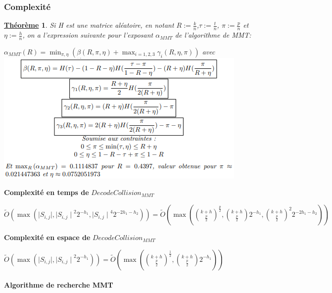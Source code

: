 \documentclass[12pt,openany]{report}
\newtheorem{theorem}{\underline{Théorème}}
\begin{document}
\subsubsection{Complexité}
\begin{theorem} \cite{Ghazal} Si H est une matrice aléatoire, en notant $ R:=\frac{k}{n} $,$  \tau:=\frac{t}{n} $, $\pi:=\frac{p}{n} $ et $ \eta :=\frac{h}{n} $, on a l'expression suivante pour l'exposant $\alpha_{MMT} $ de l'algorithme de MMT:
\begin{center}
$ \alpha_{MMT}(R)=\min_{\pi,\eta}(\beta(R,\pi,\eta)+ \max_{i=1,2,3}\gamma_i(R,\eta,\pi) )  $ avec
\includegraphics[scale=1.2]{./theo}
\end{center}

\end{theorem}


\textbf{Complexité en temps de } $DecodeCollision_{MMT}  $\\
\begin{center}


$ \tilde{O}(\max (\mid S_{i,j} \mid,{\mid S_{i,j} \mid}^{2}2^{-h_1},{\mid S_{i,j} \mid}^{4}2^{-2h_1-h_2}) )    = \tilde{O}\left( \max\left(  {{k+h}\choose {\frac{p}{2}}}^{\frac{p}{2}},{{k+h}\choose {\frac{p}{2}}}2^{-h_1} , {{k+h}\choose {\frac{p}{2}}}^{2}2^{-2h_1-h_2}\right)  \right)      $\\
\end{center}
\textbf{Complexité en espace de} $DecodeCollision_{MMT}   $\\
\begin{center}


$ \tilde{O}(\max (\mid S_{i,j} \mid,{\mid S_{i,j} \mid}^{2}2^{-h_1}) )   = \tilde{O}\left( \max \left( 
{{k+h}\choose {\frac{p}{2}}}^{\frac{1}{2}},{{k+h}\choose {\frac{p}{2}}}2^{-{h_1}}
\right)  \right)   $
\end{center}

\paragraph{Algorithme de recherche MMT}
\end{document}

